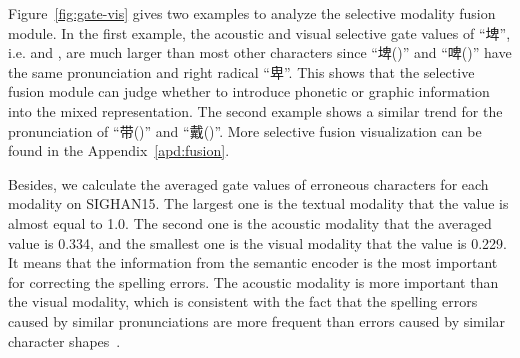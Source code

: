 \documentclass[11pt,a4paper]{article}
\begin{document}
\begin{CJK*}{UTF8}{gbsn}


Figure~\ref{fig:gate-vis} gives two examples to analyze the selective modality fusion module. 
In the first example, the acoustic and visual selective gate values of ``埤'', i.e.  and , are much larger than most other characters since ``埤()'' and ``啤()'' have the same pronunciation and right radical ``卑''.
This shows that the selective fusion module can judge whether to introduce phonetic or graphic information into the mixed representation.
The second example shows a similar trend for the pronunciation of ``带()'' and ``戴()''.
More selective fusion visualization can be found in the Appendix~\ref{apd:fusion}.

Besides, we calculate the averaged gate values of erroneous characters for each modality on SIGHAN15.
The largest one is the textual modality that the value is almost equal to 1.0.
The second one is the acoustic modality that the averaged value is 0.334, and the smallest one is the visual modality that the value is 0.229.
It means that the information from the semantic encoder is the most important for correcting the spelling errors. The acoustic modality is more important than the visual modality, which is consistent with the fact that the spelling errors caused by similar pronunciations are more frequent than errors caused by similar character shapes~\citep{vis-pho-ratio}.


\end{CJK*}
\end{document}
